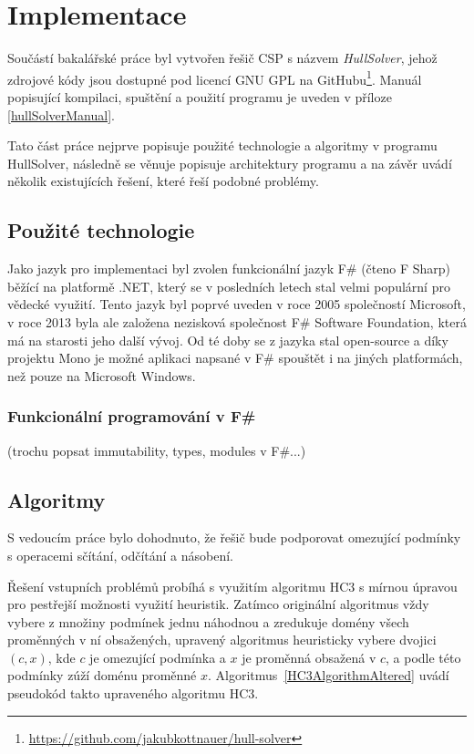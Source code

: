 



\chapter{Implementace}
Součástí bakalářské práce byl vytvořen řešič CSP s názvem \emph{HullSolver}, jehož zdrojové kódy jsou dostupné pod licencí GNU GPL na GitHubu\footnote{\url{https://github.com/jakubkottnauer/hull-solver}}. Manuál popisující kompilaci, spuštění a použití programu je uveden v příloze \ref{hullSolverManual}.

Tato část práce nejprve popisuje použité technologie a algoritmy v programu HullSolver, následně se věnuje popisuje architektury programu a na závěr uvádí několik existujících řešení, které řeší podobné problémy.


\section{Použité technologie}
Jako jazyk pro implementaci byl zvolen funkcionální jazyk F\# (čteno F Sharp) běžící na platformě .NET, který se v posledních letech stal velmi populární pro vědecké využití. Tento jazyk byl poprvé uveden v roce 2005 společností Microsoft, v roce 2013 byla ale založena nezisková společnost F\# Software Foundation, která má na starosti jeho další vývoj. Od té doby se z jazyka stal open-source a díky projektu Mono je možné aplikaci napsané v F\# spouštět i na jiných platformách, než pouze na Microsoft Windows.


\subsection{Funkcionální programování v F\#}
(trochu popsat immutability, types, modules v F\#...)

\section{Algoritmy}

S vedoucím práce bylo dohodnuto, že řešič bude podporovat omezující podmínky s operacemi sčítání, odčítání a násobení.

Řešení vstupních problémů probíhá s využitím algoritmu HC3 s mírnou úpravou pro pestřejší možnosti využití heuristik. Zatímco originální algoritmus vždy vybere z množiny podmínek jednu náhodnou a zredukuje domény všech proměnných v ní obsažených, upravený algoritmus heuristicky vybere dvojici $(c, x)$, kde $c$ je omezující podmínka a $x$ je proměnná obsažená v $c$, a podle této podmínky zúží doménu proměnné $x$. Algoritmus~\ref{HC3AlgorithmAltered} uvádí pseudokód takto upraveného algoritmu HC3.

